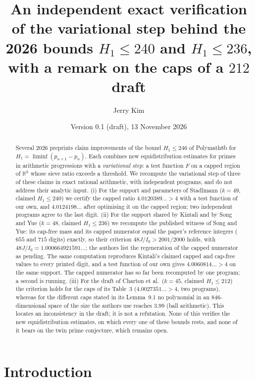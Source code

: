 \documentclass[11pt]{amsart}
\title[Verifying the variational step of the 2026 gap bounds]{An independent exact verification of the variational step behind the 2026 bounds $H_1\le240$ and $H_1\le236$, with a remark on the caps of a $212$ draft}
\author{Jerry Kim}
\date{Version 0.1 (draft), 13 November 2026}
\theoremstyle{definition}
\theoremstyle{remark}
\begin{document}
\begin{abstract}
Several 2026 preprints claim improvements of the bound $H_1\le246$ of
Polymath8b for $H_1=\liminf(p_{n+1}-p_n)$. Each combines new equidistribution
estimates for primes in arithmetic progressions with a \emph{variational step}:
a test function $F$ on a capped region of $\mathbb R^k$ whose sieve ratio
exceeds a threshold. We recompute the variational step of three of these
claims in exact rational arithmetic, with independent programs, and do not
address their analytic input. (i) For the support and parameters of Stadlmann
($k=49$, claimed $H_1\le240$) we certify the capped ratio $4.0120389\ldots>4$
with a test function of our own, and $4.0124198\ldots$ after optimising it on
the capped region; two independent programs agree to the last digit.
(ii) For the support shared by Kintali and by Song and Yue ($k=48$, claimed
$H_1\le236$) we recompute the published witness of Song and Yue: its cap-free
mass and its capped numerator equal the paper's reference integers ($655$ and
$715$ digits) exactly, so their criterion $48J/I_0>2001/2000$ holds, with
$48J/I_0=1.000664921591\ldots$; the authors list the regeneration of the
capped numerator as pending. The same computation reproduces Kintali's
claimed capped and cap-free values to every printed digit, and a test
function of our own gives $4.0060814\ldots>4$ on the same support. The capped
numerator has so far been recomputed by one program; a second is running.
(iii) For the draft of Charton et al.\ ($k=45$, claimed $H_1\le212$) the
criterion holds for the caps of its Table~3 ($4.0027351\ldots>4$, two
programs), whereas for the different caps stated in its Lemma~9.1 no
polynomial in an $846$-dimensional space of the size the authors use reaches
$3.99$ (ball arithmetic). This locates an inconsistency in the draft; it is
not a refutation. None of this verifies the new equidistribution estimates,
on which every one of these bounds rests, and none of it bears on the twin
prime conjecture, which remains open.
\end{abstract}

\maketitle

\section{Introduction}
\end{document}
